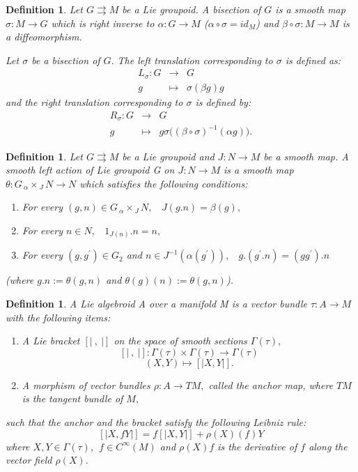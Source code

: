 \documentclass{article}
\newtheorem{definition}[theorem]{Definition}
\begin{document}
\begin{definition}
\label{bisection}
Let $ G \rightrightarrows M$ be a Lie groupoid. A bisection of $G$ is a smooth map $ \sigma : M \longrightarrow G $ which is right inverse to $\alpha : G \longrightarrow M$ ($ \alpha \circ \sigma = id_{M}$) and $\beta \circ \sigma : M \longrightarrow M $ is a diffeomorphism.

Let $\sigma$ be a bisection of $G.$ The left translation corresponding to $\sigma$ is defined as:
\begin{eqnarray}
L_{\sigma} : G & \longrightarrow & G \nonumber \\
g & \longmapsto & \sigma (\beta g) g \nonumber
\end{eqnarray}
and the right translation corresponding to $\sigma$ is defined by:
\begin{eqnarray}
 R_{\sigma} :  G & \longrightarrow &  G   \nonumber  \\
g & \longmapsto & g \sigma \big( (\beta \circ \sigma )^{-1} (\alpha g ) \big). \nonumber
\end{eqnarray}
\end{definition}

\begin{definition}
\label{groupoid action}
Let $ G \rightrightarrows M$ be a Lie groupoid and $J : N \longrightarrow M$ be a smooth map. A smooth left action of Lie groupoid G on $J : N \longrightarrow M$ is a smooth map $\theta : G_{~ \alpha} \times_{~J} N \longrightarrow N $ which satisfies the following conditions:
\begin{enumerate}
\item For every $(g,n) \in G_{~ \alpha} \times_{~J} N,~~~~ J (g.n) = \beta (g),$ 
\item For every $n \in N,~~~~ 1_{J(n)} .n = n,$
\item For every $(g , g^{\prime}) \in G_{2} $ and $n \in J^{-1} (\alpha (g^{\prime})),~~~~ g . ( g^{\prime} . n ) = (g g^{\prime})  . n$
\end{enumerate}
(where $ g.n := \theta ( g , n )$ and $ \theta (g) (n):= \theta (g , n )$).
\end{definition}

\begin{definition}
A Lie algebroid A over a manifold M is a vector bundle $\tau : A \longrightarrow M$ with the following items:
\begin{enumerate}
\item A Lie bracket $[\vert ~,~ \vert] $ on the space of smooth sections $ \Gamma( \tau),$
$$[\vert ~,~ \vert]: \Gamma (\tau) \times \Gamma (\tau) \longrightarrow \Gamma (\tau) $$
$$(X , Y ) \longmapsto [\vert X , Y \vert].$$
\item A morphism of vector bundles $\rho : A \longrightarrow TM,$ called the anchor map, where $TM$ is the tangent bundle of $M,$
\end{enumerate}
such that the anchor and the bracket satisfy the following Leibniz rule:
$$[\vert X , f Y \vert] = f [\vert X , Y \vert] + \rho (X) (f) Y$$
where $X , Y \in \Gamma (\tau)$, $~f \in C^{\infty} (M)$ and $\rho (X) f$ is the derivative of $f$ along the vector field $\rho (X).$
\end{definition}
\end{document}
